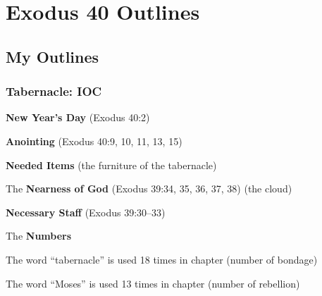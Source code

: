 \section{Exodus 40 Outlines}

\subsection{My Outlines}

\subsubsection{Tabernacle: IOC}
\begin{compactenum}[I.][8]
    \item \textbf{New Year's Day} (Exodus 40:2)  
    \item \textbf{Anointing} (Exodus 40:9, 10, 11, 13, 15) 
    \item \textbf{Needed Items} (the furniture of the tabernacle)  
    \item The \textbf{Nearness of God} (Exodus 39:34, 35, 36, 37, 38)  (the cloud)
    \item \textbf{Necessary Staff} (Exodus 39:30--33)  
    \item The \textbf{Numbers} 
    \begin{compactenum}[A.]
        \item The word ``tabernacle'' is used 18 times in chapter (number of bondage)
        \item The word ``Moses'' is used 13 times in chapter (number of rebellion)
    \end{compactenum}
\end{compactenum}

